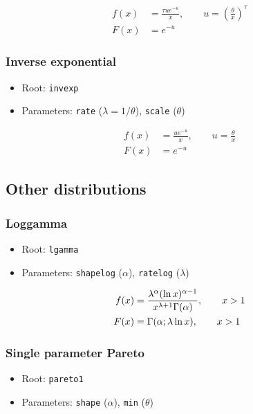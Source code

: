 \documentclass[x11names]{article}
\newcommand{\code}[1]{\texttt{#1}}
\begin{document}
\begin{align*}
  f(x) &= \frac{\tau u e^{-u}}{x},
  \qquad u = \left( \frac{\theta}{x} \right)^\tau \\
  F(x) &= e^{-u}
\end{align*}

\subsubsection*{Inverse exponential}

\begin{itemize}
\item Root: \code{invexp}
\item Parameters: \code{rate}   ($\lambda = 1/\theta$),
      \code{scale}  ($\theta$)
\end{itemize}

\begin{align*}
  f(x) &= \frac{u e^{-u}}{x},
  \qquad u = \frac{\theta}{x} \\
  F(x) &= e^{-u}
\end{align*}

\subsection{Other distributions}
\label{sec:appendix:other}

\subsubsection*{Loggamma}

\begin{itemize}
\item Root: \code{lgamma}
\item Parameters: \code{shapelog} ($\alpha$),
      \code{ratelog}   ($\lambda$)
\end{itemize}

\begin{align*}
  f(x) &= \frac{\lambda^\alpha (\ln x)^{\alpha - 1}}{%
    x^{\lambda + 1} \Gamma(\alpha)},
  \qquad x > 1 \\
  F(x) &= \Gamma( \alpha ; \lambda \ln x), \qquad x > 1
\end{align*}

\subsubsection*{Single parameter Pareto}

\begin{itemize}
\item Root: \code{pareto1}
\item Parameters: \code{shape} ($\alpha$),
      \code{min}   ($\theta$)
\end{itemize}
\end{document}
